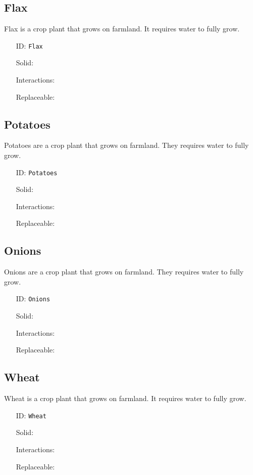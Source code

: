\subsection{Flax}\label{subsec:blocks_flax}
Flax is a crop plant that grows on farmland. It requires water to fully grow.
\newline
\begin{itemize}[nosep]
    \item[ID:] \texttt{Flax}
    \item[Solid:]  \XSolidBrush \item[Interactions:]  \XSolidBrush \item[Replaceable:]  \XSolidBrush
\end{itemize}

\subsection{Potatoes}\label{subsec:blocks_potatoes}
Potatoes are a crop plant that grows on farmland. They requires water to fully grow.
\newline
\begin{itemize}[nosep]
    \item[ID:] \texttt{Potatoes}
    \item[Solid:]  \XSolidBrush \item[Interactions:]  \XSolidBrush \item[Replaceable:]  \XSolidBrush
\end{itemize}

\subsection{Onions}\label{subsec:blocks_onions}
Onions are a crop plant that grows on farmland. They requires water to fully grow.
\newline
\begin{itemize}[nosep]
    \item[ID:] \texttt{Onions}
    \item[Solid:]  \XSolidBrush \item[Interactions:]  \XSolidBrush \item[Replaceable:]  \XSolidBrush
\end{itemize}

\subsection{Wheat}\label{subsec:blocks_wheat}
Wheat is a crop plant that grows on farmland. It requires water to fully grow.
\newline
\begin{itemize}[nosep]
    \item[ID:] \texttt{Wheat}
    \item[Solid:]  \XSolidBrush \item[Interactions:]  \XSolidBrush \item[Replaceable:]  \XSolidBrush
\end{itemize}

